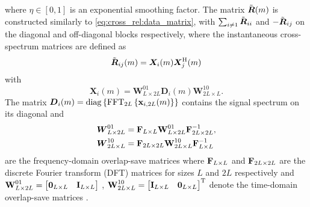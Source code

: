 \documentclass{article}
\begin{document}
where \(\eta \in [0,1]\) is an exponential smoothing factor.
The matrix \(\tilde{{\bm{{R}}}}(m)\) is constructed similarly to \eqref{eq:cross_rel:data_matrix}, with \(\sum_{i \neq 1} \tilde{{\bm{{R}}}}_{ii}\) and \(-\tilde{{\bm{{R}}}}_{ij}\) on the diagonal and off-diagonal blocks respectively, where the instantaneous cross-spectrum matrices are defined as
\begin{equation}
    \tilde{{\bm{{R}}}}_{ij}(m) = \bm{X}_{i} (m) \bm{X}_{j}^{\mathrm{H}} (m)
\end{equation}
with 
\begin{equation}
    \bm{X}_{i}(m) = \bm{{W}}^{01}_{L \times 2L} \bm{{D}}_{i}(m) \bm{{W}}^{10}_{2L \times L}.
\end{equation}
The matrix \(\bm{{D}}_{i}(m) = \operatorname{diag} \left\{ \operatorname{FFT}_{2L} \left\{ \bm{\mathrm{x}}_{i,2L}(m) \right\} \right\}\) contains the  signal spectrum on its diagonal and
\begin{align}
    \bm{{W}}_{L \times 2L}^{01} &= \bm{\mathrm{F}}_{L \times L} \bm{\mathrm{W}}_{L \times 2L}^{01} \bm{\mathrm{F}}_{2L \times 2L}^{-1},\\
    \bm{{W}}_{2L \times L}^{10} &= \bm{\mathrm{F}}_{2L \times 2L} \bm{\mathrm{W}}_{2L \times L}^{10} \bm{\mathrm{F}}_{L \times L}^{-1}\label{eq:frequency_domain:overlap}
\end{align}
are the frequency-domain overlap-save matrices where \(\bm{\mathrm{F}}_{L \times L}\) and \(\bm{\mathrm{F}}_{2L \times 2L}\) are the discrete Fourier transform (DFT) matrices for sizes \(L\) and \(2L\) respectively and \(
    \bm{\mathrm{W}}_{L \times 2L}^{01} = \begin{bmatrix}
        \bm{\mathrm{0}}_{L \times L} & \bm{\mathrm{I}}_{L \times L}
    \end{bmatrix}\)
, \(
    \bm{\mathrm{W}}_{2L \times L}^{10} = \begin{bmatrix}
        \bm{\mathrm{I}}_{L \times L} & \bm{\mathrm{0}}_{L \times L}
    \end{bmatrix}^{\mathrm{T}}\)
denote the time-domain overlap-save matrices \cite{huangClassFrequencydomainAdaptive2003}.
\end{document}
